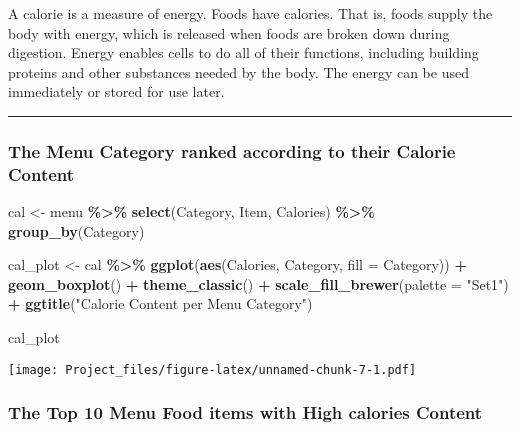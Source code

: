 \documentclass[
]{article}
\newenvironment{Shaded}{\begin{snugshade}}{\end{snugshade}}
\newcommand{\AttributeTok}[1]{\textcolor[rgb]{0.13,0.29,0.53}{#1}}
\newcommand{\FunctionTok}[1]{\textcolor[rgb]{0.13,0.29,0.53}{\textbf{#1}}}
\newcommand{\NormalTok}[1]{#1}
\newcommand{\OtherTok}[1]{\textcolor[rgb]{0.56,0.35,0.01}{#1}}
\newcommand{\SpecialCharTok}[1]{\textcolor[rgb]{0.81,0.36,0.00}{\textbf{#1}}}
\newcommand{\StringTok}[1]{\textcolor[rgb]{0.31,0.60,0.02}{#1}}
\begin{document}
A calorie is a measure of energy. Foods have calories. That is, foods
supply the body with energy, which is released when foods are broken
down during digestion. Energy enables cells to do all of their
functions, including building proteins and other substances needed by
the body. The energy can be used immediately or stored for use later.

\begin{center}\rule{0.5\linewidth}{0.5pt}\end{center}

\hypertarget{the-menu-category-ranked-according-to-their-calorie-content}{%
\subsubsection{The Menu Category ranked according to their Calorie
Content}\label{the-menu-category-ranked-according-to-their-calorie-content}}

\begin{Shaded}
\begin{Highlighting}[]
\NormalTok{cal }\OtherTok{\textless{}{-}}\NormalTok{ menu }\SpecialCharTok{\%\textgreater{}\%} 
  \FunctionTok{select}\NormalTok{(Category,}
\NormalTok{         Item,}
\NormalTok{         Calories) }\SpecialCharTok{\%\textgreater{}\%} 
  \FunctionTok{group\_by}\NormalTok{(Category)  }



\NormalTok{cal\_plot }\OtherTok{\textless{}{-}}\NormalTok{ cal }\SpecialCharTok{\%\textgreater{}\%} 
  \FunctionTok{ggplot}\NormalTok{(}\FunctionTok{aes}\NormalTok{(Calories,}
\NormalTok{             Category,}
             \AttributeTok{fill =}\NormalTok{ Category)) }\SpecialCharTok{+} 
  \FunctionTok{geom\_boxplot}\NormalTok{() }\SpecialCharTok{+} 
  \FunctionTok{theme\_classic}\NormalTok{() }\SpecialCharTok{+} 
  \FunctionTok{scale\_fill\_brewer}\NormalTok{(}\AttributeTok{palette =} \StringTok{"Set1"}\NormalTok{) }\SpecialCharTok{+} \FunctionTok{ggtitle}\NormalTok{(}\StringTok{"Calorie Content per Menu Category"}\NormalTok{)}

\NormalTok{cal\_plot}
\end{Highlighting}
\end{Shaded}

\texttt{[image: Project\_files/figure-latex/unnamed-chunk-7-1.pdf]}

\hypertarget{the-top-10-menu-food-items-with-high-calories-content}{%
\subsubsection{The Top 10 Menu Food items with High calories
Content}\label{the-top-10-menu-food-items-with-high-calories-content}}
\end{document}
